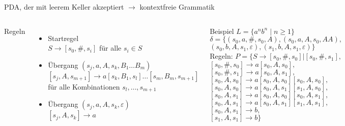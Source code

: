 
\begin{frame}{PDA, der mit leerem Keller akzeptiert $\rightarrow$ kontextfreie Grammatik}
	\label{Grammatik_aus_PDA}
	\begin{columns}
		Regeln
		\begin{itemize}
			\item Startregel\\
			$S\rightarrow [s_0, \#, s_i]$ für alle $s_i \in S$
			\item Übergang $(s_j,a,A,s_k,B_1\ldots B_m)$\\
			$[s_j,A,s_{m+1}] \rightarrow a[s_k,B_1,s_l]\ldots[s_m,B_m,s_{m+1}]$ für alle Kombinationen $s_l,\ldots,s_{m+1}$
			\item Übergang $(s_j,a,A,s_k,\varepsilon)$\\
			$[s_j,A,s_k]\rightarrow a$
		\end{itemize}
		Beispiel $L=\{a^nb^n \mid n \geq 1\}$\\
		 $\delta=\{(s_0,a,\#,s_0,A),(s_0,a,A,s_0,AA),$\\
		 \qquad$(s_0,b,A,s_1,\varepsilon),(s_1,b,A,s_1,\varepsilon)\}$\\
		 \vspace{0.5em}
		Regeln: $P=\{S \rightarrow [s_0,\#,s_0]|[s_0,\#,s_1],$\\
			$[s_0,\#,s_0]\rightarrow a[s_0,A,s_0],$\\
			$[s_0,\#,s_1]\rightarrow a[s_0,A,s_1],$\\
			$[s_0,A,s_0]\rightarrow a[s_0,A,s_0][s_0,A,s_0],$\\
			$[s_0,A,s_0]\rightarrow a[s_0,A,s_1][s_1,A,s_0],$\\
			$[s_0,A,s_1]\rightarrow a[s_0,A,s_0][s_0,A,s_1],$\\
			$[s_0,A,s_1]\rightarrow a[s_0,A,s_1][s_1,A,s_1],$\\
			$[s_0,A,s_1]\rightarrow b,$\\ $[s_1,A,s_1]\rightarrow b\}$
	\end{columns}
\end{frame}

